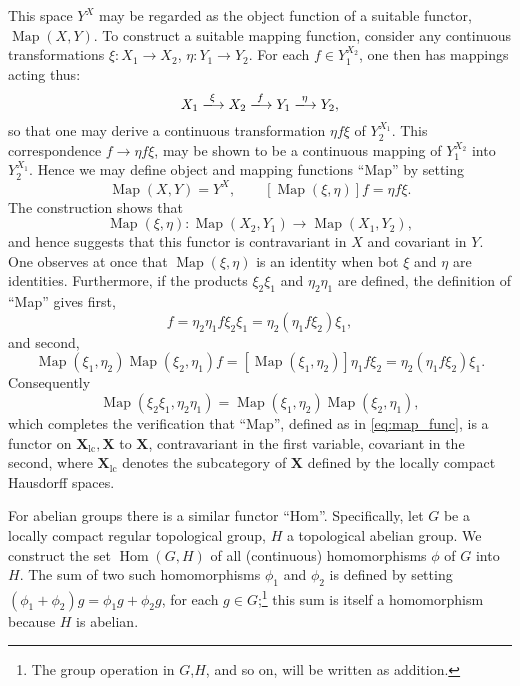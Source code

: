 \documentclass[11pt,a4paper]{report}
\DeclareMathOperator{\map}{Map}
\DeclareMathOperator{\hm}{Hom}
\begin{document}
This space $Y^X$ may be regarded as the object function of a suitable functor, $\map(X,Y)$. To construct a suitable
mapping function, consider any continuous transformations $\xi:X_1\rightarrow X_2$, $\eta:Y_1\rightarrow Y_2$.
For each $f\in Y_1^{X_2}$, one then has mappings acting thus:
\begin{equation*}
	X_1\xlongrightarrow{\xi} X_2\xlongrightarrow{f} Y_1\xlongrightarrow{\eta} Y_2,
\end{equation*}
so that one may derive a continuous transformation $\eta f\xi$ of $Y_2^{X_1}$. This correspondence 
$f\rightarrow\eta f\xi$, may be shown to be a continuous mapping of $Y_1^{X_2}$ into $Y_2^{X_1}$.
Hence we may define object and mapping functions ``Map'' by setting
\begin{equation}
	\map(X,Y)=Y^X,\qquad [\map(\xi,\eta)]f=\eta f\xi.\label{eq:map_func}
\end{equation}
The construction shows that
\begin{equation*}
	\map(\xi,\eta): \map(X_2,Y_1)\rightarrow\map(X_1,Y_2),
\end{equation*}
and hence suggests that this functor is contravariant in $X$ and covariant in $Y$. One observes at once
that $\map(\xi,\eta)$ is an identity when bot $\xi$ and $\eta$ are identities. Furthermore, if the products
$\xi_2\xi_1$ and $\eta_2\eta_1$ are defined, the definition of ``Map'' gives first,
\begin{equation*}
	[\map(\xi_2\xi_1,\eta_2\eta_1)] f = \eta_2\eta_1 f \xi_2\xi_1 = \eta_2(\eta_1 f \xi_2)\xi_1,
\end{equation*}
and second,
\begin{equation*}
	\map(\xi_1,\eta_2)\map(\xi_2,\eta_1) f = [\map(\xi_1,\eta_2)]\eta_1 f \xi_2 = \eta_2(\eta_1 f \xi_2)\xi_1.
\end{equation*}
Consequently
\begin{equation*}
	\map(\xi_2\xi_1,\eta_2\eta_1) = \map(\xi_1,\eta_2)\map(\xi_2,\eta_1),
\end{equation*}
which completes the verification that ``Map'', defined as in \cref{eq:map_func}, is a functor on
$\mathbf{X}_{\mathrm{lc}},\mathbf{X}$ to $\mathbf{X}$, contravariant in the first variable, covariant in the 
second, where $\mathbf{X}_{\mathrm{lc}}$ denotes the subcategory of $\mathbf{X}$ defined by the locally compact
Hausdorff spaces.

For abelian groups there is a similar functor ``Hom''. Specifically, let $G$ be a locally compact regular topological
group, $H$ a topological abelian group. We construct the set $\hm(G,H)$ of all (continuous) homomorphisms  $\phi$ of $G$
into $H$. The sum of two such homomorphisms $\phi_1$ and $\phi_2$ is defined by setting $(\phi_1+\phi_2)g =
\phi_1 g + \phi_2 g$, for each $g\in G$;\footnote{The group operation in $G$,$H$, and so on, will be written as
addition.} this sum is itself a homomorphism because $H$ is abelian.
\end{document}
